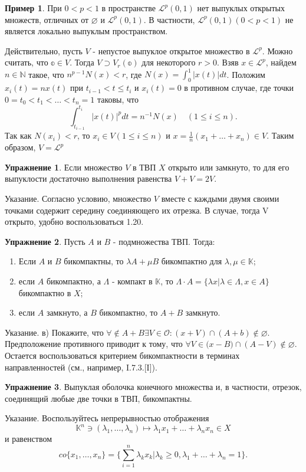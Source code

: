\documentclass[a4paper, 12pt]{article}
\theoremstyle{definition}
\newtheorem{example}{Пример}
\newtheorem{problem}{Упражнение}[section]
\theoremstyle{remark}
\begin{document}
\begin{example}
    При $0 < p < 1$ в пространстве $\mathcal {L}^p (0,1)$ нет выпуклых открытых множеств, отличных от $\varnothing$ и $\mathcal {L}^p (0,1)$. В частности, $\mathcal {L}^p (0,1) (0< p < 1)$ не является локально выпуклым пространством.

    Действительно, пусть $V$ - непустое выпуклое открытое множество в $\mathcal {L}^p$. Можно считать, что $\mathbb{o}\in V$. Тогда $V\supset V_r(\mathbb{o})$ для некоторого $r > 0$. Взяв $x\in \mathcal {L}^p $, найдем $n\in \mathbb{N}$ такое, что $n^{p-1}N(x)< r$, где $N(x) = \int_0^1 |x(t)|dt$. Положим $x_i(t) = nx(t)$ при $t_{i-1}< t \le t_i$ и $x_i(t) = 0$ в противном случае, где точки $0 = t_0< t_1 < \dots < t_n = 1$ таковы, что
    \[\int_{t_{i-1}}^{t_i} |x(t)|^p dt = n^{-1} N(x) \quad (1\le i \le n).\]
    Так как $N(x_i)< r$, то $x_i\in V (1 \le i \le n)$ и $x = \frac{1}{n} (x_1 + \dots + x_n)\in V$. Таким образом, $V = \mathcal L ^p$
\end{example}
\begin{problem}
    Если множество $V$ в ТВП $X$ открыто или замкнуто, то для его выпуклости достаточно выполнения равенства $V+V=2V$.

    Указание. Согласно условию, множество $V$ вместе с каждыми двумя своими точками содержит середину соединяющего их отрезка. В случае, тогда V открыто, удобно воспользоваться 1.20.
\end{problem}
\begin{problem}
    Пусть $A$ и $B$ - подмножества ТВП. Тогда:
    \begin{enumerate}
        \item Если $A$ и $B$ бикомпактны, то $\lambda A + \mu B$ бикомпактно для $\lambda, \mu \in \mathbb{K}$;
        \item если $A$ бикомпактно, а $\Lambda$ - компакт в $\mathbb{K}$, то $\Lambda \cdot A = \{\lambda x | \lambda \in \Lambda, x\in A\}$ бикомпактно в $X$;
        \item если $A$ замкнуто, а $B$ бикомпактно, то $A+B$ замкнуто.
    \end{enumerate}
    Указание. в) Покажите, что $\forall \notin A+B \exists V\in \mathcal O : (x+V)\cap (A+b)\notin \varnothing$. Предположение противного приводит к тому, что $\forall V\in \mathcal (x-B)\cap (A-V)\notin \varnothing$. Остается воспользоваться критерием бикомпактности в терминах направленностей (см., например, I.7.3.[I]).
\end{problem}
\begin{problem}
    Выпуклая оболочка конечного множества и, в частности, отрезок, соединящий любые две точки в ТВП, бикомпактны.

    Указание. Воспользуйтесь непрерывностью отображения 
    \[\mathbb{K}^n \ni (\lambda_1, \dots, \lambda_n)\mapsto \lambda_1 x_1 + \dots + \lambda_n x_n\in X\]
    и равенством
    \[co\{x_1, \dots, x_n\} = \{\sum_{i=1}^n \lambda_k x_k | \lambda_k\ge 0, \lambda_1 + \dots + \lambda_n = 1\}.\]
\end{problem}
\end{document}
